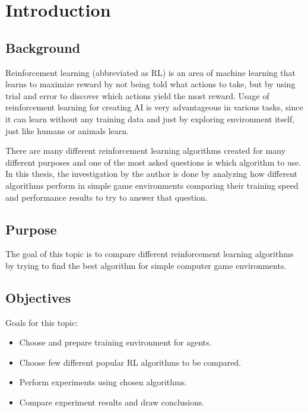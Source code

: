 \documentclass[12pt, a4paper]{article}
\begin{document}

\newpage
{}
\setcounter{page}{2}
\setcounter{tocdepth}{3}
\setcounter{secnumdepth}{5}

\tableofcontents

\newpage

\section*{Introduction}

\subsection*{Background}


Reinforcement learning (abbreviated as RL) is an area of machine learning that learns to maximize reward by not being told what actions to take,
but by using trial and error to discover which actions yield the most reward.
Usage of reinforcement learning for creating AI is very advantageous in various tasks, since it can learn without any training data and just by exploring environment itself,
just like humans or animals learn.

There are many different reinforcement learning algorithms created for many different purposes and one of the most asked questions is which algorithm to use.
In this thesis, the investigation by the author is done by analyzing how different algorithms perform in simple game environments comparing their training speed and performance results to try to answer that question.

\subsection*{Purpose}

The goal of this topic is to compare different reinforcement learning algorithms by trying to find the best algorithm for simple computer game environments.

\subsection*{Objectives} 
Goals for this topic:
\begin{itemize}
  \item Choose and prepare training environment for agents.
  \item Choose few different popular RL algorithms to be compared.
  \item Perform experiments using chosen algorithms.
  \item Compare experiment results and draw conclusions.
\end{itemize}
\end{document}
